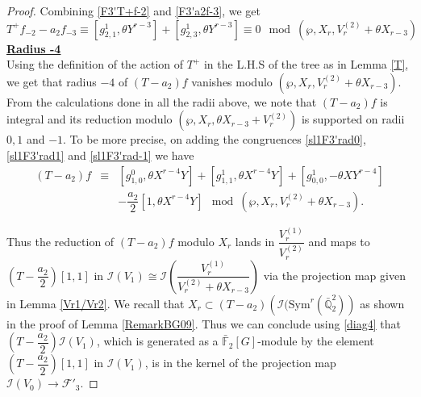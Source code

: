 \documentclass[11pt, reqno]{amsart}
\numberwithin{equation}{section}
\newcommand\Q{\mathbb{Q}}
\newcommand\sF{{\mathcal{F}}}
\newcommand{\F}{\mathbb{F}}
\newcommand\Sym{{\mathrm {Sym}}}
\theoremstyle{definition}
\theoremstyle{remark}
\theoremstyle{definition}
\theoremstyle{remark}
\theoremstyle{remark}
\begin{document}
\begin{proof}
Combining \eqref{F3'T+f-2} and \eqref{F3'a2f-3}, we get
\begin{equation*}
 T^{+}f_{-2}-a_{2}f_{-3}\equiv \left[g_{2,1}^{1}, \theta Y^{r-3}\right]+\left[g_{2,3}^{1}, \theta Y^{r-3}\right] \equiv 0 \mod (\wp,X_{r},V_{r}^{(2)}+\theta X_{r-3})
    \end{equation*}
\noindent\underline{\textbf{Radius -4}}\\
Using the definition of the action of  $T^{+}$ in the L.H.S of the tree as in Lemma \ref{T}, we get that radius $-4$ of $(T-a_{2})f$ vanishes modulo $(\wp,X_{r},V_{r}^{(2)}+\theta X_{r-3})$.\\

From the calculations done in all the radii above, we note that $(T-a_2)f$ is integral and its reduction modulo $(\wp, X_r, \theta X_{r-3}+V_r^{(2)})$ is supported on radii $0,1$ and $-1$. To be more precise, on adding the congruences \eqref{sl1F3'rad0}, \eqref{sl1F3'rad1} and \eqref{sl1F3'rad-1} we have
\begin{eqnarray}\label{sl1V1even}
(T-a_{2})f&\equiv&\left[g_{1,0}^{0}, \theta X^{r-4}Y\right] + \left[g_{1,1}^{1},  \theta X^{r-4}Y\right] + \left[g_{0,0}^{1}, -\theta XY^{r-4}\right] \nonumber \\
&& -\dfrac{a_{2}}{2}\left[1, \theta X^{r-4}Y \right ] \mod (\wp,X_{r}, V_{r}^{(2)}+ \theta X_{r-3}).
\end{eqnarray} 

Thus the reduction of $(T-a_{2})f$ modulo $X_{r}$ lands in $\dfrac{V_{r}^{(1)}}{V_{r}^{(2)}}$ and maps to $\left(T-\dfrac{a_{2}}{2}\right)[1,1]$ in $\mathcal{I}(V_{1}) \cong  \mathcal{I}\left(\dfrac{V_{r}^{(1)}}{V_{r}^{(2)}+\theta X_{r-3}}\right)$  via the projection map given in Lemma \ref{Vr1/Vr2}. We recall that $X_{r} \subset (T-a_{2})\left(\mathcal{I}(\Sym^{r}(\bar{\Q}_{2}^{2})\right)$ as shown in the proof of Lemma \ref{RemarkBG09}. Thus we can conclude using \eqref{diag4} that $\left(T-\dfrac{a_{2}}{2}\right)\mathcal{I}(V_{1})$, which is generated as a $\bar{\F}_{2}[G]$-module by the element $\left(T-\dfrac{a_{2}}{2}\right)[1,1]$ in $\mathcal{I}(V_{1})$, is in the kernel of the projection map $\mathcal{I} \left(V_{0}\right) \to 
 \sF'_{3}$.
\end{proof}
\end{document}
